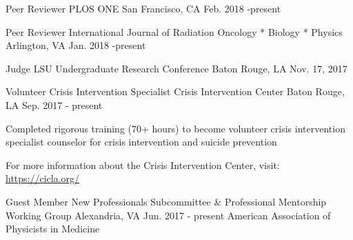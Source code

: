 


\begin{cventries}
  \cventry
    {Peer Reviewer} %
    {PLOS ONE} %
    {San Francisco, CA} %
    {Feb. 2018 -present} %
    {}
    {}
\end{cventries}
\begin{cventries}
  \cventry
    {Peer Reviewer} %
    {International Journal of Radiation Oncology * Biology * Physics} %
    {Arlington, VA} %
    {Jan. 2018 -present} %
    {}
    {}
\end{cventries}
\begin{cventries}
  \cventry
    {Judge} %
    {LSU Undergraduate Research Conference} %
    {Baton Rouge, LA} %
    {Nov. 17, 2017} %
    {}
    {}
\end{cventries}
\begin{cventries}
  \cventry
    {Volunteer Crisis Intervention Specialist} %
    {Crisis Intervention Center} %
    {Baton Rouge, LA} %
    {Sep. 2017 - present} %
    {
    \begin{cvitems} %
      \item {Completed rigorous training (70+ hours) to become volunteer crisis intervention specialist counselor for crisis intervention and suicide prevention}
      \item {For more information about the Crisis Intervention Center, visit: \url{https://cicla.org/}}
    \end{cvitems}
    }
    {}
\end{cventries}
%
\begin{cventries}
  \cventry
    {Guest Member} %
    {New Professionals Subcommittee \& Professional Mentorship Working Group} %
    {Alexandria, VA} %
    {Jun. 2017 - present} %
    {}
    {American Association of Physicists in Medicine}
\end{cventries}
